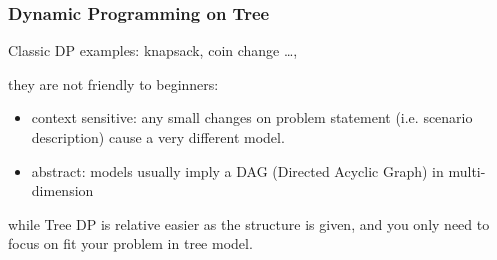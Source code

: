 \documentclass{beamer}
\begin{document}
\begin{frame}
  \frametitle{Dynamic Programming on Tree}
Classic DP examples: knapsack, coin change \ldots,

they are not friendly to beginners:
\begin{itemize}
  \item context sensitive: any small changes on problem statement (i.e. scenario description) cause a very different model.
  \item abstract: models usually imply a DAG (Directed Acyclic Graph) in multi-dimension
\end{itemize}

while Tree DP is relative easier as the structure is given, and you only need to focus on fit your problem in tree model.
\end{frame}
\end{document}
